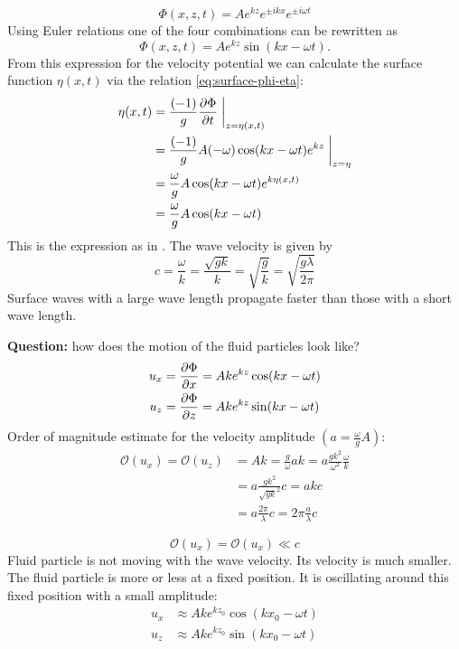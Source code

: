 \begin{equation}
\Phi(x,z,t)=Ae^{kz}e^{\pm ikx}e^{\pm i\omega t}
\end{equation}
Using Euler relations one of the four combinations can be rewritten as
\begin{equation}
\Phi(x,z,t)=Ae^{kz}\sin(kx-\omega t).
\end{equation}
From this expression for the velocity potential we can calculate the surface function $\eta(x,t)$ via the relation \eqref{eq:surface-phi-eta}:
\begin{align}
\eta(x,t) &= \frac{(-1)}{g}\frac{\partial \Phi}{\partial t}\biggm\vert_{z=\eta(x,t)}\\
&= \frac{(-1)}{g}A(-\omega)\cos(kx-\omega t)e^{kz}\biggm\vert_{z=\eta}\\
&= \frac{\omega}{g}A\cos(kx-\omega t)e^{k\eta(x,t)}\\
&=\frac{\omega}{g}A\cos(kx-\omega t)
\end{align}
This is the expression as in . The wave velocity is given by
\begin{equation}
c = \frac{\omega}{k} = \frac{\sqrt{gk}}{k} = \sqrt{\frac{g}{k}} = \sqrt{\frac{g\lambda}{2\pi}}
\end{equation}
Surface waves with a large wave length propagate faster than those with a short wave length.

\textbf{Question:} how does the motion of the fluid particles look like?
\begin{align}
u_x &= \frac{\partial \Phi}{\partial x}=Ake^{kz}\cos(kx-\omega t)\\
u_z &= \frac{\partial \Phi}{\partial z}=Ake^{kz}\sin(kx-\omega t)
\end{align}
Order of magnitude estimate for the velocity amplitude $(a=\frac{\omega}{g}A)$:
\begin{align}
\mathcal{O}(u_x) = \mathcal{O}(u_z) &= Ak = \frac{g}{\omega}ak=a\frac{gk^2}{\omega^2} \frac{\omega}{k}\\
&= a \frac{gk^2}{\sqrt{gk}^2}c = akc\\
&= a\frac{2\pi}{\lambda}c = 2\pi\frac{a}{\lambda}c
\end{align}

\begin{equation}
\mathcal{O}(u_x) = \mathcal{O}(u_x) \ll c
\end{equation}
Fluid particle is not moving with the wave velocity. Its velocity is much smaller. The fluid particle is more or less at a fixed position. It is oscillating around this fixed position with a small amplitude:
\begin{align}
u_x &\approx Ake^{kz_0}\cos(kx_0-\omega t)\\
u_z &\approx Ake^{kz_0}\sin(kx_0-\omega t)
\end{align}

